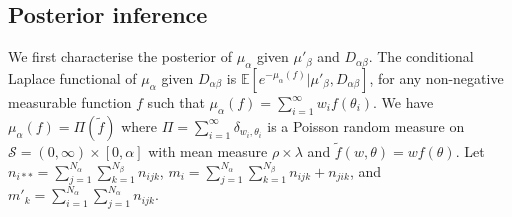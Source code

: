 \documentclass{article}
\begin{document}
\subsection{Posterior inference}
We first characterise the posterior of $\mu_\alpha$ given $\mu'_\beta$ and $D_{\alpha\beta}$. The conditional Laplace functional of $\mu_\alpha$ given $D_{\alpha\beta}$ is $\mathbb{E}[e^{-\mu_\alpha(f)}|\mu'_\beta, D_{\alpha\beta}]$, for any non-negative measurable function $f$ such that $\mu_\alpha(f) = \sum_{i=1}^{\infty}w_i f(\theta_i)$. We have $\mu_\alpha(f) = \Pi(\tilde{f})$ where $\Pi = \sum_{i=1}^{\infty} \delta_{w_i, \theta_i}$ is a Poisson random measure on $\mathcal{S} = (0, \infty) \times [0, \alpha]$ with mean measure $\rho \times \lambda$ and $\tilde{f}(w, \theta) = wf(\theta)$. Let $n_{i**} = \sum_{j=1}^{N_\alpha}\sum_{k=1}^{N_\beta}n_{ijk}$, $m_i = \sum_{j=1}^{N_\alpha}\sum_{k=1}^{N_\beta} n_{ijk} + n_{jik}$, and $m'_k = \sum_{i=1}^{N_\alpha} \sum_{j=1}^{N_\alpha} n_{ijk}$.
\end{document}
